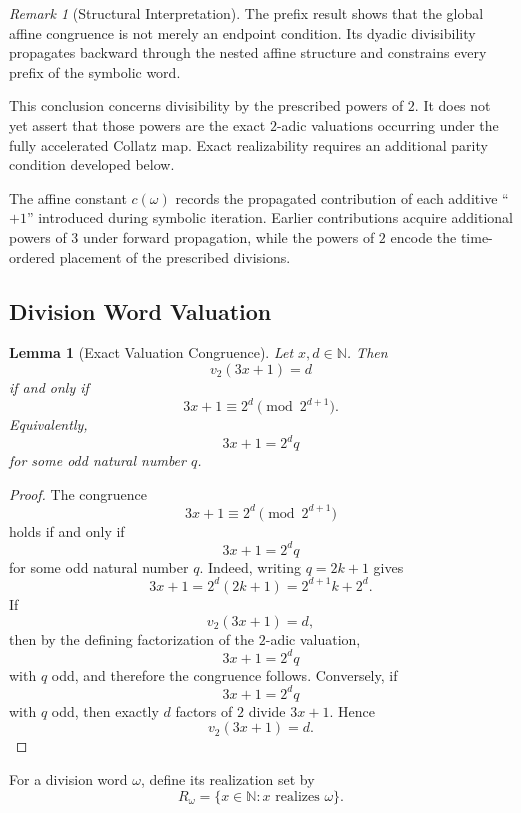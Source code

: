 \documentclass[12pt, oneside]{article}
\numberwithin{equation}{section}
\theoremstyle{definition}
\theoremstyle{plain}
\newtheorem{lemma}[theorem]{Lemma}
\theoremstyle{remark}
\newtheorem*{remark}{Remark}
\begin{document}
\begin{remark}[Structural Interpretation]
The prefix result shows that the global affine congruence is not merely an
endpoint condition. Its dyadic divisibility propagates backward through
the nested affine structure and constrains every prefix of the symbolic
word.

This conclusion concerns divisibility by the prescribed powers of \(2\).
It does not yet assert that those powers are the exact \(2\)-adic
valuations occurring under the fully accelerated Collatz map. Exact
realizability requires an additional parity condition developed below.

The affine constant \(c(\omega)\) records the propagated contribution of
each additive ``\(+1\)'' introduced during symbolic iteration. Earlier
contributions acquire additional powers of \(3\) under forward
propagation, while the powers of \(2\) encode the time-ordered placement
of the prescribed divisions.
\end{remark}

\subsection{Division Word Valuation}

\begin{lemma}[Exact Valuation Congruence]
\label{lem:exact-valuation-congruence}
Let \(x,d\in\mathbb N\). Then
\[
v_2(3x+1)=d
\]
if and only if
\[
3x+1\equiv 2^d \pmod{2^{d+1}}.
\]
Equivalently,
\[
3x+1=2^d q
\]
for some odd natural number \(q\).
\end{lemma}

\begin{proof}
The congruence
\[
3x+1\equiv 2^d \pmod{2^{d+1}}
\]
holds if and only if
\[
3x+1=2^d q
\]
for some odd natural number \(q\). Indeed, writing \(q=2k+1\) gives
\[
3x+1 = 2^d(2k+1) = 2^{d+1}k+2^d.
\]
If
\[
v_2(3x+1)=d,
\]
then by the defining factorization of the \(2\)-adic valuation,
\[
3x+1=2^d q
\]
with \(q\) odd, and therefore the congruence follows.  Conversely, if
\[
3x+1=2^d q
\]
with \(q\) odd, then exactly \(d\) factors of \(2\) divide \(3x+1\). Hence
\[
v_2(3x+1)=d.
\]
\end{proof}

For a division word \(\omega\), define its realization set by
\[
R_\omega = \{x\in\mathbb{N} : x \text{ realizes } \omega\}.
\]
\end{document}
